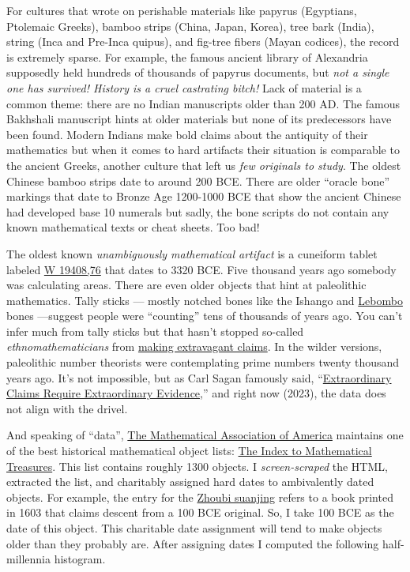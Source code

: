 For cultures that wrote on perishable materials like papyrus (Egyptians,
Ptolemaic Greeks), bamboo strips (China, Japan, Korea), tree bark
(India), string (Inca and Pre-Inca quipus), and fig-tree fibers (Mayan
codices), the record is extremely sparse. For example, the famous
ancient library of Alexandria supposedly held hundreds of thousands of
papyrus documents, but \emph{not a single one has survived! History is a
cruel castrating bitch!} Lack of material is a common theme: there are
no Indian manuscripts older than 200 AD. The famous Bakhshali manuscript
hints at older materials but none of its predecessors have been found.
Modern Indians make bold claims about the antiquity of their mathematics
but when it comes to hard artifacts their situation is comparable to the
ancient Greeks, another culture that left us \emph{few originals to
study}. The oldest Chinese bamboo strips date to around 200 BCE. There
are older ``oracle bone'' markings that date to Bronze Age 1200-1000 BCE
that show the ancient Chinese had developed base 10 numerals but sadly,
the bone scripts do not contain any known mathematical texts or cheat
sheets. Too bad!

The oldest known \emph{unambiguously mathematical artifact} is a
cuneiform tablet labeled
\href{https://cdli.mpiwg-berlin.mpg.de/artifacts/3118}{W 19408,76} that
dates to 3320 BCE. Five thousand years ago somebody was calculating
areas. There are even older objects that hint at paleolithic
mathematics. Tally sticks --- mostly notched bones like the Ishango and
\href{https://www.pnas.org/doi/full/10.1073/pnas.1204213109}{Lebombo}
bones ---suggest people were ``counting'' tens of thousands of years
ago. You can't infer much from tally sticks but that hasn't stopped
so-called \emph{ethnomathematicians} from
\href{https://afrolegends.com/2013/08/29/the-ishango-bone-craddle-of-mathematics/}{making
extravagant claims}. In the wilder versions, paleolithic number
theorists were contemplating prime numbers twenty thousand years ago.
It's not impossible, but as Carl Sagan famously said,
``\href{https://effectiviology.com/sagan-standard-extraordinary-claims-require-extraordinary-evidence/}{Extraordinary
Claims Require Extraordinary Evidence},'' and right now (2023), the data
does not align with the drivel.

And speaking of ``data'', \href{https://www.maa.org/}{The Mathematical
Association of America} maintains one of the best historical
mathematical object lists:
\href{https://www.maa.org/press/periodicals/convergence/index-to-mathematical-treasures}{The
Index to Mathematical Treasures}. This list contains roughly 1300
objects. I \emph{screen-scraped} the HTML, extracted the list, and
charitably assigned hard dates to ambivalently dated objects. For
example, the entry for the
\href{https://www.maa.org/press/periodicals/convergence/mathematical-treasures-zhoubi-suanjing}{Zhoubi
suanjing} refers to a book printed in 1603 that claims descent from a
100 BCE original. So, I take 100 BCE as the date of this object. This
charitable date assignment will tend to make objects older than they
probably are. After assigning dates I computed the following
half-millennia histogram.

